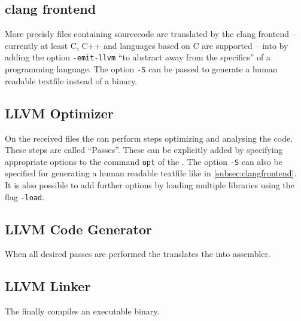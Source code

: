 \subsection{clang frontend}\label{subsec:clangfrontend}
More precisly files containing sourcecode are translated by the clang frontend -- currently at least C, C++ and languages based on C are supported -- into \llvmir by adding the option \texttt{-emit-llvm} \enquote{to abstract away from the specifics} \cite{FastScopDetection} of a programming language.
The option \texttt{-S} can be passed to generate a human readable textfile instead of a \llvmir binary.
\subsection{LLVM Optimizer}\label{subsec:optimizer}
On the received files the \opt can perform steps optimizing and analysing the code.
These steps are called \enquote{Passes}.
These can be explicitly added by specifying appropriate options to the command \texttt{opt} of the \opt.
The option \texttt{-S} can also be specified for generating a human readable textfile like in \autoref{subsec:clangfrontend}.\\
It is also possible to add further options by loading multiple libraries using the flag \texttt{-load}.
\subsection{LLVM Code Generator}
When all desired passes are performed the \generator translates the \llvmir into assembler.
\subsection{LLVM Linker}
The \linker finally compiles an executable binary.
